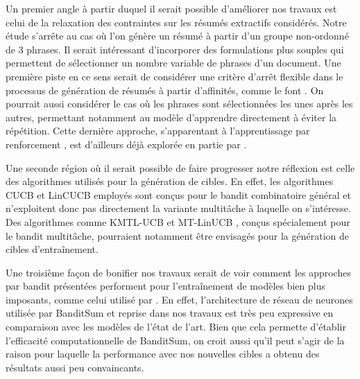 Un premier angle à partir duquel il serait possible d'améliorer nos travaux
est celui de la relaxation des contraintes sur les résumés extractifs considérés.
Notre étude s'arrête au cas où l'on génère un résumé à partir 
d'un groupe non-ordonné de 3 phrases.
Il serait intéressant d'incorporer des formulations plus souples 
qui permettent de sélectionner un nombre variable de phrases d'un document.
Une première piste en ce sens serait de considérer une critère d'arrêt 
flexible dans le processus de génération de résumés à partir d'affinités,
comme le font \citet{luo-etal-2019-reading}. 
On pourrait aussi considérer le cas où les phrases sont sélectionnées 
les unes après les autres, permettant notamment au modèle d'apprendre 
directement à éviter la répétition.
Cette dernière approche, s'apparentant à l'apprentissage par renforcement \citep{Sutton1998},
est d'ailleurs déjà explorée en partie par \citet{zhong-etal-2020-extractive}. 

Une seconde région où il serait possible de faire progresser notre réflexion est 
celle des algorithmes utilisés pour la génération de cibles.
En effet, les algorithmes CUCB et LinCUCB employés sont 
conçus pour le bandit combinatoire général et n'exploitent donc pas 
directement la variante multitâche à laquelle on s'intéresse.
Des algorithmes comme KMTL-UCB \citep{deshmukh2017multi} et MT-LinUCB \citep{soare2014multi},
conçus spécialement pour le bandit multitâche, pourraient notamment être envisagés
pour la génération de cibles d'entraînement.

Une troisième façon de bonifier nos travaux serait de voir comment les approches 
par bandit présentées performent pour l'entraînement de modèles 
bien plus imposants, comme celui utilisé par \citet{liu2019text}.
En effet, l'architecture de réseau de neurones utilisée par BanditSum 
et reprise dans nos travaux est très peu expressive en comparaison avec les modèles
de l'état de l'art.
Bien que cela permette d'établir l'efficacité computationnelle 
de BanditSum, on croit aussi qu'il peut s'agir de la raison 
pour laquelle la performance avec nos nouvelles cibles a
obtenu des résultats aussi peu convaincants.